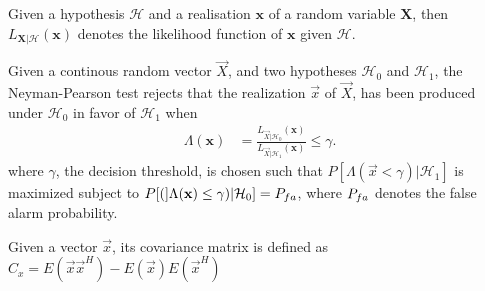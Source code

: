 \documentclass[a4paper, openany, oneside]{memoir}
\begin{document}
\begin{blockDefinition}
Given a hypothesis $\mathcal{H}$ and a realisation $\mathbf{x}$ of a random variable $\mathbf{X}$, then $L_{\mathbf{X} | \mathcal{H}}(\mathbf{x})$ denotes the likelihood function of $\mathbf{x}$ given $\mathcal{H}$.
\end{blockDefinition}

\begin{blockDefinition}
Given a continous random vector $\vec{X}$, and two hypotheses $\mathcal{H}_0$ and $\mathcal{H}_1$, the Neyman-Pearson test rejects that the realization $\vec{x}$ of $\vec{X}$, has been produced under $\mathcal{H}_0$ in favor of $\mathcal{H}_1$
when
\begin{align*}
    \Lambda (\mathbf{x}) &= \frac{L_{\vec{X} | \mathcal{H}_0} (\mathbf{x})}{L_{\vec{X} | \mathcal{H}_1}(\mathbf{x})} \leq \gamma.
\end{align*}
where $\gamma$, the decision threshold, is chosen such that $P[\Lambda(\vec{x} < \gamma) | \mathcal{H}_1]$ is maximized subject to $P[(]\Lambda(\vec{x}) \leq \gamma) | \mathcal{H}_0] = P\ss{fa}$, where $P\ss{fa}$ denotes the false alarm probability. %
\end{blockDefinition}

\clearpage
\begin{blockDefinition}
Given a vector $\vec{x}$, its covariance matrix is defined as $C_{x} = E(\vec{x}\vec{x}^H)-E(\vec{x})E(\vec{x}^H)$
\end{blockDefinition}
\end{document}
